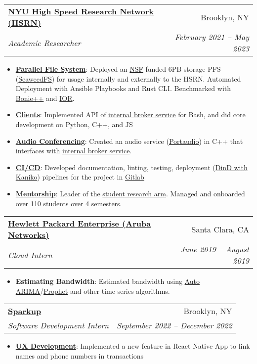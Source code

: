 \documentclass[letterpaper,11pt]{article}
\makeatletter
\newcommand{\resumeItem}[2]{
	\item[]\small{
		\textbf{#1}{: #2 \vspace{-2pt}}
	}
}
\newcommand{\resumeSubheading}[4]{
	\vspace{-1pt}\item[]
	\begin{tabular*}{0.96\textwidth}{l@{\extracolsep{\fill}}r}
		\textbf{#1} & #2 \\
		\textit{\small#3} & \textit{\small #4} \\
	\end{tabular*}\vspace{-7pt}
}
\newcommand{\resumeItemListStart}{\begin{itemize}[leftmargin=3.75mm]}
\newcommand{\resumeItemListEnd}{\end{itemize}\vspace{-5pt}}
\makeatother
\begin{document}
\resumeSubheading
{\href{https://www.nyu.edu/life/information-technology/research-computing-services/research-data-and-tools/high-speed-research-network-hsrn.html}{NYU High Speed Research Network (HSRN)}}{Brooklyn, NY}
{Academic Researcher}{February 2021 -- May 2023}
\resumeItemListStart
\resumeItem{\href{https://www.nsf.gov/awardsearch/showAward?AWD_ID=2232817&HistoricalAwards=false}{Parallel File System}}
{Deployed an \href{https://www.nsf.gov/awardsearch/showAward?AWD_ID=2232817&HistoricalAwards=false}{NSF} funded 6PB storage PFS (\href{https://github.com/seaweedfs/seaweedfs}{SeaweedFS}) for usage internally and externally to the HSRN. Automated Deployment with Ansible Playbooks and Rust CLI. Benchmarked with \href{https://sourceforge.net/projects/bonnie/}{Bonie++} and \href{https://github.com/hpc/ior}{IOR}.}
\resumeItem{\href{https://dev.hpc.nyu.edu/corelink/corelink-client/}{Clients}}
{Implemented API of \href{https://corelink.hsrn.nyu.edu/}{internal broker service} for Bash, and did core development on Python, C++, and JS}
\resumeItem{\href{https://dev.hpc.nyu.edu/corelink/corelink-examples}{Audio Conferencing}}
{Created an audio service (\href{http://portaudio.com/}{Portaudio}) in C++ that interfaces with \href{https://corelink.hsrn.nyu.edu/}{internal broker service}.}
\resumeItem{\href{https://dev.hpc.nyu.edu/corelink/corelink-documentation/-/pipelines}{CI/CD}}
{Developed documentation, linting, testing, deployment (\href{https://github.com/GoogleContainerTools/kaniko}{DinD with Kaniko}) pipelines for the project in \href{https://dev.hsrn.nyu.edu/}{Gitlab}}
\resumeItem{\href{https://engineering.nyu.edu/research-innovation/student-research/vertically-integrated-projects/vip-teams/nyu-holodeck-high-speed-research-network}{Mentorship}}
{Leader of the \href{https:/vip.hsrn.nyu.edu}{student research arm}. Managed and onboarded over 110 students over 4 semesters.}
\resumeItemListEnd

\resumeSubheading
{\href{https://www.arubanetworks.com/company/about-us/}{Hewlett Packard Enterprise (Aruba Networks)}}{Santa Clara, CA}
{Cloud Intern}{June 2019 -- August 2019}
\resumeItemListStart
\resumeItem{Estimating Bandwidth}
{Estimated bandwidth using \href{https://en.wikipedia.org/wiki/Autoregressive_integrated_moving_average}{Auto ARIMA}/\href{https://facebook.github.io/prophet/}{Prophet} and other time series algorithms.}
\resumeItemListEnd

\resumeSubheading
{\href{https://sparkupbiz.us}{Sparkup}}{Brooklyn, NY}
{Software Development Intern}{September 2022 -- December 2022}
\resumeItemListStart
\resumeItem{\href{https://play.google.com/store/apps/details?id=com.sparkup}{UX Development}}
{Implemented a new feature in React Native App to link names and phone numbers in transactions}
\resumeItemListEnd
\end{document}
